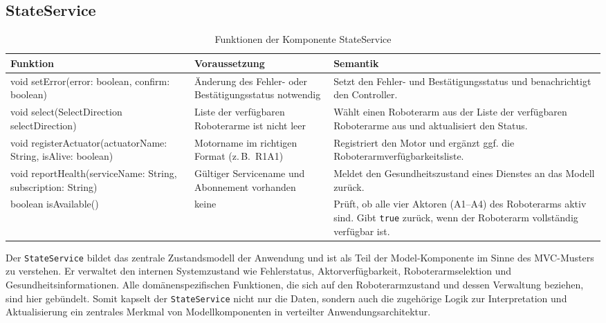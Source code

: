 \subsection{StateService}
\begin{table}[h!]
    \centering
    \begin{tabular}{|p{5cm}|p{5cm}|p{5cm}|}
        \hline
        \textbf{Funktion} & \textbf{Voraussetzung} & \textbf{Semantik} \\
        \hline
        void setError(error: boolean, confirm: boolean) & Änderung des Fehler- oder Bestätigungsstatus notwendig & Setzt den Fehler- und Bestätigungsstatus und benachrichtigt den Controller. \\
        \hline
        void select(SelectDirection selectDirection) & Liste der verfügbaren Roboterarme ist nicht leer & Wählt einen Roboterarm aus der Liste der verfügbaren Roboterarme aus und aktualisiert den Status. \\
        \hline
        void registerActuator(actuatorName: String, isAlive: boolean) & Motorname im richtigen Format (z.\,B.\ R1A1) & Registriert den Motor und ergänzt ggf. die Roboterarmverfügbarkeitsliste. \\
        \hline
        void reportHealth(serviceName: String, subscription: String) & Gültiger Servicename und Abonnement vorhanden & Meldet den Gesundheitszustand eines Dienstes an das Modell zurück. \\
        \hline
        boolean isAvailable() & keine & Prüft, ob alle vier Aktoren (A1–A4) des Roboterarms aktiv sind. Gibt \texttt{true} zurück, wenn der Roboterarm vollständig verfügbar ist. \\
        \hline
    \end{tabular}
    \caption{Funktionen der Komponente StateService}
    \label{tab:StateService}
\end{table}
\clearpage
Der \texttt{StateService} bildet das zentrale Zustandsmodell der Anwendung und ist als Teil der Model-Komponente im Sinne des MVC-Musters zu verstehen. 
Er verwaltet den internen Systemzustand wie Fehlerstatus, Aktorverfügbarkeit, Roboterarmselektion und Gesundheitsinformationen. 
Alle domänenspezifischen Funktionen, die sich auf den Roboterarmzustand und dessen Verwaltung beziehen, sind hier gebündelt. 
Somit kapselt der \texttt{StateService} nicht nur die Daten, sondern auch die zugehörige Logik zur Interpretation und Aktualisierung ein zentrales Merkmal von Modellkomponenten in verteilter Anwendungsarchitektur.



